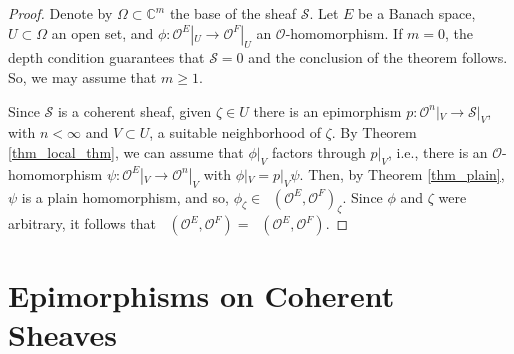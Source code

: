 \documentclass{amsart}
\numberwithin{equation}{section}
\theoremstyle{definition}
\theoremstyle{plain}
\theoremstyle{remark}
\begin{document}
\begin{proof}
Denote by $\Omega\subset\mathbb{C}^m$ the base of the sheaf ${\ensuremath{\mathcal{{S}}}}$.
Let $E$ be a Banach space,  $U\subset\Omega$ an open set, and 
$\phi:{\ensuremath{\mathcal{{O}}}}^E|_U\rightarrow{\ensuremath{\mathcal{{O}}}}^F|_U$ an ${\ensuremath{\mathcal{{O}}}}$-homomorphism.
If $m=0$, the depth condition guarantees that ${\ensuremath{\mathcal{{S}}}}=0$ and the conclusion
of the theorem
follows. So, we may assume that $m\geq 1$.

Since ${\ensuremath{\mathcal{{S}}}}$ is a coherent sheaf, given $\zeta\in U$ there is 
an epimorphism $p:{\ensuremath{\mathcal{{O}}}}^n|_V\rightarrow{\ensuremath{\mathcal{{S}}}}|_V$, with $n<\infty$ and
$V\subset U$, a suitable neighborhood of $\zeta$.
By Theorem \ref{thm_local_thm}, we can assume that  $\phi|_V$
factors through $p|_V$, i.e., 
there is an ${\ensuremath{\mathcal{{O}}}}$-homomorphism 
$\psi:{\ensuremath{\mathcal{{O}}}}^E|_V\rightarrow{\ensuremath{\mathcal{{O}}}}^n|_V$ with $\phi|_V=p|_V\psi$.
Then, by Theorem \ref{thm_plain}, $\psi$ is a plain homomorphism, and so, 
$\phi_\zeta\in{{\mathop{\mathbf{Hom}_\mathrm{min}}}}({\ensuremath{\mathcal{{O}}}}^E,{\ensuremath{\mathcal{{O}}}}^F)_\zeta$. Since 
$\phi$ and $\zeta$ were arbitrary, it follows that ${{\mathop{\mathbf{Hom}_\mathrm{min}}}}({\ensuremath{\mathcal{{O}}}}^E,{\ensuremath{\mathcal{{O}}}}^F)={{\mathop{\mathbf{Hom}_{\ensuremath{\mathcal{{O}}}}}}}({\ensuremath{\mathcal{{O}}}}^E,{\ensuremath{\mathcal{{O}}}}^F)$. 
\end{proof}

\section{ Epimorphisms on Coherent Sheaves }
\end{document}
